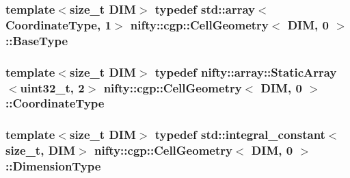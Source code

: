 \subsubsection[{Base\+Type}]{\setlength{\rightskip}{0pt plus 5cm}template$<$size\+\_\+t D\+I\+M$>$ typedef std\+::array$<${\bf Coordinate\+Type}, 1$>$ {\bf nifty\+::cgp\+::\+Cell\+Geometry}$<$ D\+I\+M, 0 $>$\+::{\bf Base\+Type}}\label{classnifty_1_1cgp_1_1CellGeometry_3_01DIM_00_010_01_4_a299d8c228b7529d2e95f90aa3b2f7528}
\hypertarget{classnifty_1_1cgp_1_1CellGeometry_3_01DIM_00_010_01_4_a3c8cec60edc558f44940e98135a521f0}{}
\subsubsection[{Coordinate\+Type}]{\setlength{\rightskip}{0pt plus 5cm}template$<$size\+\_\+t D\+I\+M$>$ typedef {\bf nifty\+::array\+::\+Static\+Array}$<$uint32\+\_\+t, 2$>$ {\bf nifty\+::cgp\+::\+Cell\+Geometry}$<$ D\+I\+M, 0 $>$\+::{\bf Coordinate\+Type}}\label{classnifty_1_1cgp_1_1CellGeometry_3_01DIM_00_010_01_4_a3c8cec60edc558f44940e98135a521f0}
\hypertarget{classnifty_1_1cgp_1_1CellGeometry_3_01DIM_00_010_01_4_a71116d45ef5d2db3ccf29b0258df02ed}{}
\subsubsection[{Dimension\+Type}]{\setlength{\rightskip}{0pt plus 5cm}template$<$size\+\_\+t D\+I\+M$>$ typedef std\+::integral\+\_\+constant$<$size\+\_\+t, D\+I\+M$>$ {\bf nifty\+::cgp\+::\+Cell\+Geometry}$<$ D\+I\+M, 0 $>$\+::{\bf Dimension\+Type}}\label{classnifty_1_1cgp_1_1CellGeometry_3_01DIM_00_010_01_4_a71116d45ef5d2db3ccf29b0258df02ed}
\hypertarget{classnifty_1_1cgp_1_1CellGeometry_3_01DIM_00_010_01_4_a825cfc0d2e082ccd4b34e5ab2046dbe6}{}
